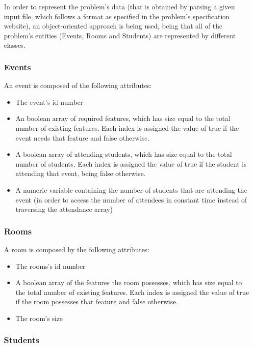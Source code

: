 \documentclass[conference]{IEEEtran}
\begin{document}
In order to represent the problem's data (that is obtained by parsing a given input file, which follows a format as specified in the problem's specification website), an object-oriented approach is being used, being that all of the problem's entities (Events, Rooms and Students) are represented by different classes.

\subsubsection{Events}

An event is composed of the following attributes:
\begin{itemize}
    \item The event's id number
    \item An boolean array of required features, which has size equal to the total number of existing features. Each index is assigned the value of true if the event needs that feature and false otherwise.
    \item A boolean array of attending students, which has size equal to the total number of students. Each index is assigned the value of true if the student is attending that event, being false otherwise.
    \item A numeric variable containing the number of students that are attending the event (in order to access the number of attendees in constant time instead of traversing the attendance array)
\end{itemize}

\subsubsection{Rooms}

A room is composed by the following attributes:
\begin{itemize}
    \item The rooms's id number
    \item A boolean array of the features the room possesses, which has size equal to the total number of existing features. Each index is assigned the value of true if the room possesses that feature and false otherwise.
    \item The room's size
\end{itemize}

\subsubsection{Students}
\end{document}
